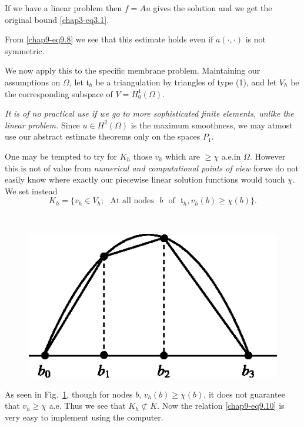 \begin{remark}\label{chap9-rem9.2}
If we have a linear problem then $f=Au$ gives the solution and we get
the original bound \eqref{chap3-eq3.1}.
\end{remark}

\begin{remark}\label{chap9-rem9.3}
From \eqref{chap9-eq9.8} we see that this estimate holds even if
$a(\cdot,\cdot)$ is not symmetric.
\end{remark}

We now apply this to the specific membrane problem. Maintaining our
assumptions on $\Omega$, let $\mathfrak{t}_{h}$ be a triangulation by
triangles of type (1), and let $V_{h}$ be the corresponding subspace
of $V=H^{1}_{0}(\Omega)$.

\begin{remark}\label{chap9-rem9.4}
{\em It is of no practical use if we go to more sophisticated finite
elements, unlike the linear problem.} Since $u\in H^{2}(\Omega)$ is
the maximum smoothness, we may atmost use our abstract estimate
theorems only on the spaces $P_{1}$.
\end{remark}

One may be tempted to try for $K_{h}$ those $v_{h}$ which are $\geq
\chi$ a.e.\@ in $\Omega$. However this is not of value from {\em
  numerical and computational points of view} for\pageoriginale we do
not easily know where exactly our piecewise linear solution functions
would touch $\chi$. We set instead
\begin{equation*}
K_{h}=\{v_{h}\in V_{h};\text{~ At all nodes~ }b \text{~ of~ }
\mathfrak{t}_{h}, v_{h}(b)\geq \chi(b)\}.\tag{9.10}\label{chap9-eq9.10}
\end{equation*}

\eject


\begin{remark}\label{chap9-rem9.5}
~

\begin{figure}[H]
\centering
\includegraphics{figure/fig9.3.eps}
\caption{}\label{chap9-fig9.3}
\end{figure}

As seen in Fig.~\ref{chap9-fig9.3}, though for nodes $b$,
$v_{h}(b)\geq \chi (b)$, it does not guarantee that $v_{h}\geq \chi$
a.e. Thus we see that $K_{h}\not\subset K$. Now the relation
\eqref{chap9-eq9.10} is very easy to implement using the computer.
\end{remark}

